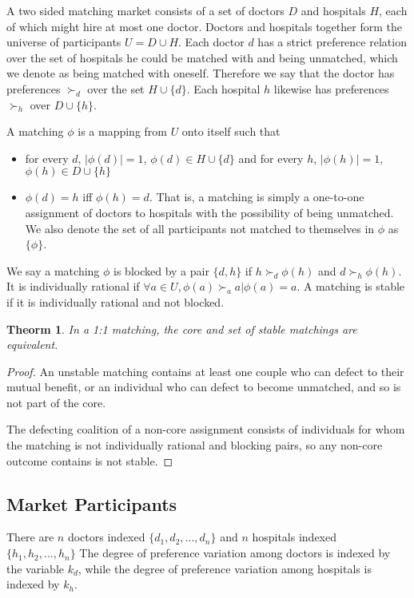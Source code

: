 \documentclass[WP]{AEA}
\newtheorem{thm}{Theorm}
\begin{document}
A two sided matching market consists of a set of doctors $D$ and  hospitals $H$, each of which might hire at most one doctor. Doctors and hospitals together form the universe of participants $U = D \cup H$.  Each doctor $d$ has a strict preference relation over the set of hospitals he could be matched with and being unmatched, which we denote as being matched with oneself. Therefore we say that the doctor has preferences $\succ_{d}$ over the set $H \cup \{d\}$. Each hospital $h$ likewise has preferences $\succ_h$ over $D \cup \{h\}$. 

A matching $\phi$ is a mapping from $U$ onto itself such that 
\begin{itemize}
	\item for every $d$, $|\phi(d)| = 1$, $\phi(d) \in H \cup \{d\} $ and for every  $h$, $|\phi(h)| = 1$, $\phi(h) \in D \cup \{h\}$
	\item $\phi(d) = h$ iff $\phi(h) = d$.  That is, a matching is simply a one-to-one assignment of doctors to hospitals with the possibility of being unmatched. We also denote the set of all participants not matched to themselves in $\phi$ as $\{\phi\}$.
\end{itemize}
We say a matching $\phi$ is blocked by a pair $\{d,h\}$ if $h \succ_d \phi(h)$ and $d \succ_h \phi(h)$. It is individually rational if $\forall a \in U ,\phi(a) \succ_a a \vert \phi(a) = a$. A matching is stable if it is individually rational and not blocked.


\begin{thm}
	In a 1:1 matching, the core and set of stable matchings are equivalent. 	
\end{thm}
\begin{proof}
	An unstable matching contains at least one couple who can defect to their mutual benefit, or an individual who can defect to become unmatched, and so is not part of the core.

	The defecting coalition of a non-core assignment consists of individuals for whom the matching is not individually rational and blocking pairs, so any non-core outcome contains is not stable.
\end{proof}

\subsection{Market Participants}

There are $n$ doctors  indexed $\{ d_1, d_2, ... ,d_n\}$ and  $n$ hospitals  indexed $\{ h_1, h_2, ... ,h_n\}$ The degree of preference variation among doctors is indexed by the variable $k_d$, while the degree of preference variation among hospitals is indexed by $k_h$.
	
\end{document}

